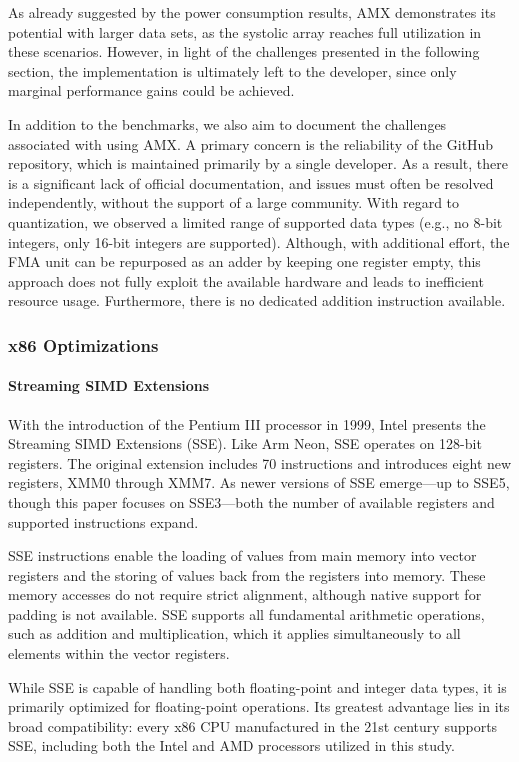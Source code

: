 \documentclass[modern,longauthor]{aastex7}
\begin{document}
As already suggested by the power consumption results, AMX demonstrates its potential with larger data sets, as the systolic array reaches full utilization in these scenarios. However, in light of the challenges presented in the following section, the implementation is ultimately left to the developer, since only marginal performance gains could be achieved.

In addition to the benchmarks, we also aim to document the challenges associated with using AMX. A primary concern is the reliability of the GitHub repository, which is maintained primarily by a single developer. As a result, there is a significant lack of official documentation, and issues must often be resolved independently, without the support of a large community. With regard to quantization, we observed a limited range of supported data types (e.g., no 8-bit integers, only 16-bit integers are supported). Although, with additional effort, the FMA unit can be repurposed as an adder by keeping one register empty, this approach does not fully exploit the available hardware and leads to inefficient resource usage. Furthermore, there is no dedicated addition instruction available.
\subsubsection{x86 Optimizations}\label{subsec:x86-optimizations}
\paragraph{Streaming SIMD Extensions}
With the introduction of the Pentium III processor in 1999, Intel presents the Streaming SIMD Extensions (SSE). Like Arm Neon, SSE operates on 128-bit registers. The original extension includes 70 instructions and introduces eight new registers, XMM0 through XMM7. As newer versions of SSE emerge—up to SSE5, though this paper focuses on SSE3—both the number of available registers and supported instructions expand.

SSE instructions enable the loading of values from main memory into vector registers and the storing of values back from the registers into memory. These memory accesses do not require strict alignment, although native support for padding is not available. SSE supports all fundamental arithmetic operations, such as addition and multiplication, which it applies simultaneously to all elements within the vector registers.

While SSE is capable of handling both floating-point and integer data types, it is primarily optimized for floating-point operations. Its greatest advantage lies in its broad compatibility: every x86 CPU manufactured in the 21st century supports SSE, including both the Intel and AMD processors utilized in this study.
\end{document}
